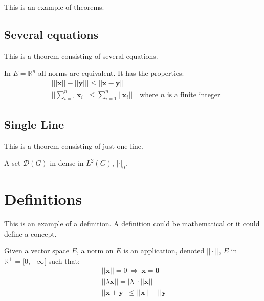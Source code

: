 \documentclass[11pt,fleqn]{book} %
\begin{document}
This is an example of theorems.

\subsection{Several equations}
This is a theorem consisting of several equations.

\begin{theorem}
In $E=\mathbb{R}^n$ all norms are equivalent. It has the properties:
\begin{align}
& \big| ||\mathbf{x}|| - ||\mathbf{y}|| \big|\leq || \mathbf{x}- \mathbf{y}||\\
&  ||\sum_{i=1}^n\mathbf{x}_i||\leq \sum_{i=1}^n||\mathbf{x}_i||\quad\text{where $n$ is a finite integer}
\end{align}
\end{theorem}

\subsection{Single Line}
This is a theorem consisting of just one line.

\begin{theorem}
A set $\mathcal{D}(G)$ in dense in $L^2(G)$, $|\cdot|_0$. 
\end{theorem}


\section{Definitions}

This is an example of a definition. A definition could be mathematical or it could define a concept.

\begin{definition}
Given a vector space $E$, a norm on $E$ is an application, denoted $||\cdot||$, $E$ in $\mathbb{R}^+=[0,+\infty[$ such that:
\begin{align}
& ||\mathbf{x}||=0\ \Rightarrow\ \mathbf{x}=\mathbf{0}\\
& ||\lambda \mathbf{x}||=|\lambda|\cdot ||\mathbf{x}||\\
& ||\mathbf{x}+\mathbf{y}||\leq ||\mathbf{x}||+||\mathbf{y}||
\end{align}
\end{definition}
\end{document}
